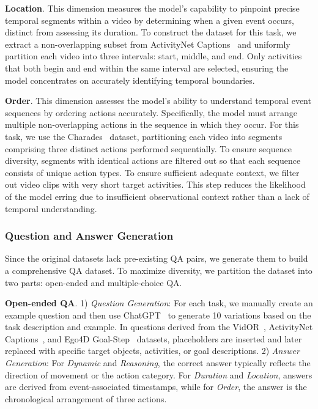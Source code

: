 \noindent\textbf{Location}. This dimension measures the model's capability to pinpoint precise temporal segments within a video by determining when a given event occurs, distinct from assessing its duration.
To construct the dataset for this task, we extract a non-overlapping subset from ActivityNet Captions~\cite{Krishna2017Dense} and uniformly partition each video into three intervals: start, middle, and end. Only activities that both begin and end within the same interval are selected, ensuring the model concentrates on accurately identifying temporal boundaries.

\noindent\textbf{Order}. This dimension assesses the model's ability to understand temporal event sequences by ordering actions accurately. Specifically, the model must arrange multiple non-overlapping actions in the sequence in which they occur. For this task, we use the Charades~\cite{Sigurdsson2016Hollywood} dataset, partitioning each video into segments comprising three distinct actions performed sequentially. To ensure sequence diversity, segments with identical actions are filtered out so that each sequence consists of unique action types. To ensure sufficient adequate context, we filter out video clips with very short target activities. This step reduces the likelihood of the model erring due to insufficient observational context rather than a lack of temporal understanding.

\subsubsection{Question and Answer Generation}
Since the original datasets lack pre-existing QA pairs, we generate them to build a comprehensive QA dataset. To maximize diversity, we partition the dataset into two parts: open-ended and multiple-choice QA.

\noindent\textbf{Open-ended QA}. 1) \textit{Question Generation}: For each task, we manually create an example question and then use ChatGPT~\cite{OpenAI2024GPT-4} to generate 10 variations based on the task description and example. In questions derived from the VidOR~\cite{Shang2019Annotating}, ActivityNet Captions~\cite{Krishna2017Dense}, and Ego4D Goal-Step~\cite{Song2023Ego4D} datasets, placeholders are inserted and later replaced with specific target objects, activities, or goal descriptions. 2) \textit{Answer Generation}: For \textit{Dynamic} and \textit{Reasoning}, the correct answer typically reflects the direction of movement or the action category. For \textit{Duration} and \textit{Location}, answers are derived from event-associated timestamps,  while for \textit{Order}, the answer is the chronological arrangement of three actions. 


